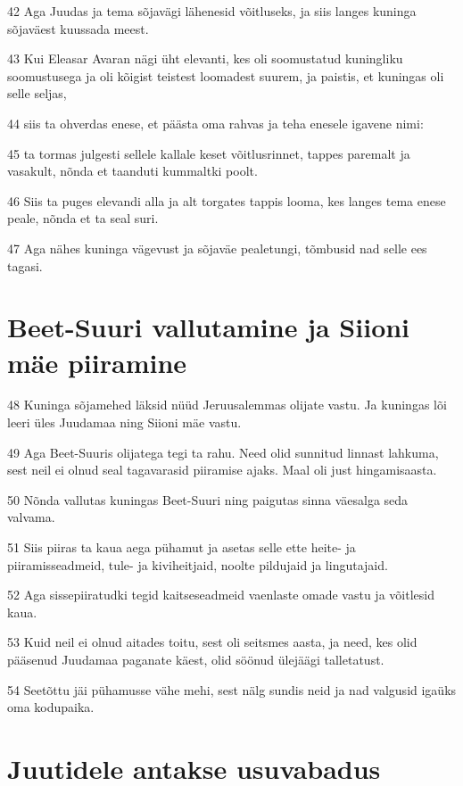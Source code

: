 \par 42 Aga Juudas ja tema sõjavägi lähenesid võitluseks, ja siis langes kuninga sõjaväest kuussada meest.
\par 43 Kui Eleasar Avaran nägi üht elevanti, kes oli soomustatud kuningliku soomustusega ja oli kõigist teistest loomadest suurem, ja paistis, et kuningas oli selle seljas,
\par 44 siis ta ohverdas enese, et päästa oma rahvas ja teha enesele igavene nimi:
\par 45 ta tormas julgesti sellele kallale keset võitlusrinnet, tappes paremalt ja vasakult, nõnda et taanduti kummaltki poolt.
\par 46 Siis ta puges elevandi alla ja alt torgates tappis looma, kes langes tema enese peale, nõnda et ta seal suri.
\par 47 Aga nähes kuninga vägevust ja sõjaväe pealetungi, tõmbusid nad selle ees tagasi. 

\section*{Beet-Suuri vallutamine ja Siioni mäe piiramine}

\par 48 Kuninga sõjamehed läksid nüüd Jeruusalemmas olijate vastu. Ja kuningas lõi leeri üles Juudamaa ning Siioni mäe vastu.
\par 49 Aga Beet-Suuris olijatega tegi ta rahu. Need olid sunnitud linnast lahkuma, sest neil ei olnud seal tagavarasid piiramise ajaks. Maal oli just hingamisaasta.
\par 50 Nõnda vallutas kuningas Beet-Suuri ning paigutas sinna väesalga seda valvama.
\par 51 Siis piiras ta kaua aega pühamut ja asetas selle ette heite- ja piiramisseadmeid, tule- ja kiviheitjaid, noolte pildujaid ja lingutajaid.
\par 52 Aga sissepiiratudki tegid kaitseseadmeid vaenlaste omade vastu ja võitlesid kaua.
\par 53 Kuid neil ei olnud aitades toitu, sest oli seitsmes aasta, ja need, kes olid pääsenud Juudamaa paganate käest, olid söönud ülejäägi talletatust.
\par 54 Seetõttu jäi pühamusse vähe mehi, sest nälg sundis neid ja nad valgusid igaüks oma kodupaika. 

\section*{Juutidele antakse usuvabadus}

